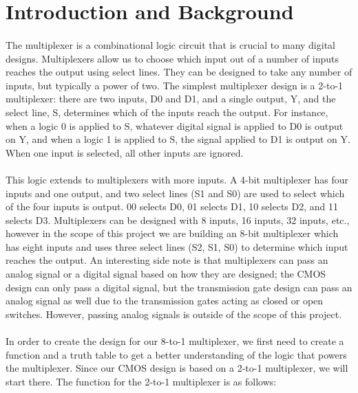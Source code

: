 \documentclass{article}
\begin{document}
\section{Introduction and Background}
  \paragraph{}
  The multiplexer is a combinational logic circuit that is crucial to many digital designs. Multiplexers allow us to choose which input out of a number of inputs reaches the output using select lines. They can be designed to take any number of inputs, but typically a power of two. The simplest multiplexer design is a 2-to-1 multiplexer: there are two inputs, D0 and D1, and a single output, Y, and the select line, S, determines which of the inputs reach the output. For instance, when a logic 0 is applied to S, whatever digital signal is applied to D0 is output on Y, and when a logic 1 is applied to S, the signal applied to D1 is output on Y. When one input is selected, all other inputs are ignored.

  \paragraph{}
  This logic extends to multiplexers with more inputs. A 4-bit multiplexer has four inputs and one output, and two select lines (S1 and S0) are used to select which of the four inputs is output. 00 selects D0, 01 selects D1, 10 selects D2, and 11 selects D3. Multiplexers can be designed with 8 inputs, 16 inputs, 32 inputs, etc., however in the scope of this project we are building an 8-bit multiplexer which has eight inputs and uses three select lines (S2, S1, S0) to determine which input reaches the output. An interesting side note is that multiplexers can pass an analog signal or a digital signal based on how they are designed; the CMOS design can only pass a digital signal, but the transmission gate design can pass an analog signal as well due to the transmission gates acting as closed or open switches. However, passing analog signals is outside of the scope of this project.

  \paragraph{}
  In order to create the design for our 8-to-1 multiplexer, we first need to create a function and a truth table to get a better understanding of the logic that powers the multiplexer. Since our CMOS design is based on a 2-to-1 multiplexer, we will start there. The function for the 2-to-1 multiplexer is as follows:
\end{document}

